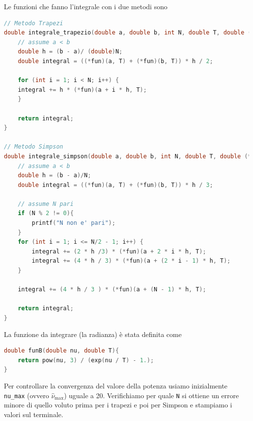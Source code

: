 \documentclass[a4paper, titlepage]{article}
\begin{document}
Le funzioni che fanno l'integrale con i due metodi sono

\begin{lstlisting}[language=C]
// Metodo Trapezi
double integrale_trapezio(double a, double b, int N, double T, double (*fun)(double, double)){
    // assume a < b
    double h = (b - a)/ (double)N;
    double integral = ((*fun)(a, T) + (*fun)(b, T)) * h / 2;

    for (int i = 1; i < N; i++) {
    integral += h * (*fun)(a + i * h, T);
    }

    return integral;
}

// Metodo Simpson
double integrale_simpson(double a, double b, int N, double T, double (*fun)(double, double)){
    // assume a < b
    double h = (b - a)/N;
    double integral = ((*fun)(a, T) + (*fun)(b, T)) * h / 3;

    // assume N pari
    if (N % 2 != 0){
        printf("N non e' pari");
    }
    for (int i = 1; i <= N/2 - 1; i++) {
        integral += (2 * h /3) * (*fun)(a + 2 * i * h, T);
        integral += (4 * h / 3) * (*fun)(a + (2 * i - 1) * h, T);
    }

    integral += (4 * h / 3 ) * (*fun)(a + (N - 1) * h, T);

    return integral;
}
\end{lstlisting}

La funzione da integrare (la radianza) è stata definita come
\begin{lstlisting}[language=C]
double funB(double nu, double T){
    return pow(nu, 3) / (exp(nu / T) - 1.);
}
\end{lstlisting}
Per controllare la convergenza del valore della potenza usiamo inizialmente \texttt{nu\_max} (ovvero $\hat \nu_\text{max}$) uguale a 20. Verifichiamo per quale \texttt{N} si ottiene un errore minore di quello voluto prima per i trapezi e poi per Simpson e stampiamo i valori sul terminale.
\end{document}
